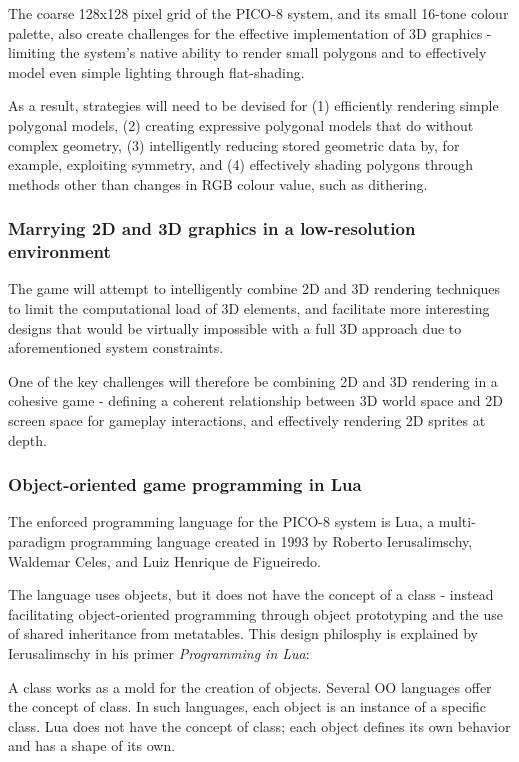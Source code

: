 \documentclass{article}
\begin{document}
The coarse 128x128 pixel grid of the PICO-8 system, and its small 16-tone colour palette, also create
challenges for the effective implementation of 3D graphics - limiting the system's native ability to
render small polygons and to effectively model even simple lighting through flat-shading.

As a result, strategies will need to be devised for (1) efficiently rendering simple polygonal
models, (2) creating expressive polygonal models that do without complex geometry, (3) intelligently
reducing stored geometric data by, for example, exploiting symmetry, and (4) effectively shading
polygons through methods other than changes in RGB colour value, such as dithering.

\subsubsection*{Marrying 2D and 3D graphics in a low-resolution environment}
The game will attempt to intelligently combine 2D and 3D rendering techniques to limit
the computational load of 3D elements, and facilitate more interesting designs that would
be virtually impossible with a full 3D approach due to aforementioned system constraints.

One of the key challenges will therefore be combining 2D and 3D rendering in a cohesive game - 
defining a coherent relationship between 3D world space and 2D screen space for
gameplay interactions, and effectively rendering 2D sprites at depth.

\subsubsection*{Object-oriented game programming in Lua}
The enforced programming language for the PICO-8 system is Lua, a multi-paradigm programming
language created in 1993 by Roberto Ierusalimschy, Waldemar Celes, and Luiz Henrique de Figueiredo.

The language uses objects, but it does not have the concept of a class - instead facilitating
object-oriented programming through object prototyping and the use of shared inheritance
from metatables.\cite{ierusalimschy} This design philosphy is explained by Ierusalimschy in his
primer \textit{Programming in Lua}:

\begin{displayquote}
A class works as a mold for the creation of objects. Several OO languages offer the concept of class. In such languages, each object is an instance of a specific class. Lua does not have the concept of class; each object defines its own behavior and has a shape of its own.
\end{displayquote}
\end{document}
